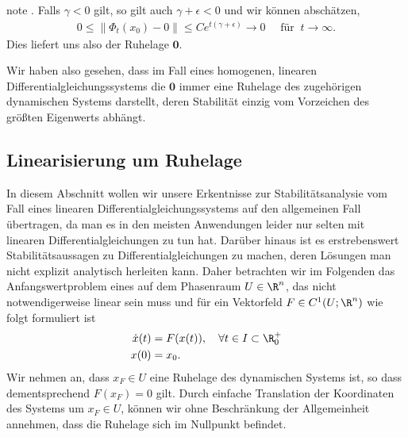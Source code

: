 \documentclass[letterpaper,10pt,german]{jupyterBook}
\begin{document}
\begin{sphinxadmonition}{note}
. Falls \(\gamma <0\) gilt, so gilt auch \(\gamma + \epsilon <0\) und wir können abschätzen,
\begin{equation*}
\begin{split}0\leq \|\Phi_t(x_0)-0\|\leq C e^{t (\gamma + \epsilon)} \to 0 \quad \text{ für } \ t \to \infty.\end{split}
\end{equation*}
\sphinxAtStartPar
Dies liefert uns also  der Ruhelage \(\mathbf{0}\).
\end{sphinxadmonition}

\sphinxAtStartPar
Wir haben also gesehen, dass im Fall eines homogenen, linearen Differentialgleichungssystems die \(\mathbf{0}\) immer eine Ruhelage des zugehörigen dynamischen Systems darstellt, deren Stabilität einzig vom Vorzeichen des größten Eigenwerts abhängt.


\subsection{Linearisierung um Ruhelage}
\label{\detokenize{odestability/ruhelagen:linearisierung-um-ruhelage}}\label{\detokenize{odestability/ruhelagen:s-linearisierung-ruhelage}}
\sphinxAtStartPar
In diesem Abschnitt wollen wir unsere Erkentnisse zur Stabilitätsanalysie vom Fall eines linearen Differentialgleichungssystems auf den allgemeinen Fall übertragen, da man es in den meisten Anwendungen leider nur selten mit linearen Differentialgleichungen zu tun hat.
Darüber hinaus ist es erstrebenswert Stabilitätsaussagen zu Differentialgleichungen zu machen, deren Lösungen man nicht explizit analytisch herleiten kann.
Daher betrachten wir im Folgenden das Anfangswertproblem eines  auf dem Phasenraum \(U\in \R^n\), das nicht notwendigerweise linear sein muss und für ein Vektorfeld \(F\in C^1(U;\R^n)\) wie folgt formuliert ist
\begin{equation}\label{equation:odestability/ruhelagen:eq:awpallg}
\begin{split}\dot{x}(t) &= F(x(t)), \quad \forall t \in I \subset \R^+_0\\
x(0) &= x_0.\end{split}
\end{equation}
\sphinxAtStartPar
Wir nehmen an, dass \(x_F \in U\) eine Ruhelage des dynamischen Systems ist, so dass dementsprechend \(F(x_F) = 0\) gilt.
Durch einfache Translation der Koordinaten des Systems um \(x_F \in U\), können wir ohne Beschränkung der Allgemeinheit annehmen, dass die Ruhelage sich im Nullpunkt befindet.
\end{document}
